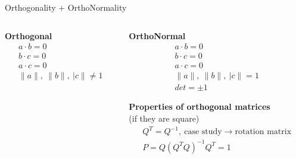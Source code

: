 \documentclass[aspectratio=169]{beamer}
\begin{document}
\begin{frame}[t]{Orthogonality + OrthoNormality}
\begin{columns}[T,onlytextwidth]
\begin{column}{0.49\textwidth}
            \begin{minipage}{0.58\textwidth}
            \end{minipage}\hfill
            \begin{minipage}{0.40\textwidth}
                \centering\textbf{Orthogonal}
                \begin{align*}
                    a \cdot b = 0 \\
                    b \cdot c = 0 \\
                    a \cdot c = 0 \\
                    \|a\|,\ \|b\|,\ |c\| \neq 1
                \end{align*}
            \end{minipage}
        \end{column}
        \begin{column}{0.49\textwidth}
            \begin{minipage}{0.58\textwidth}
            \end{minipage}\hfill
            \begin{minipage}{0.40\textwidth}
                \centering\textbf{OrthoNormal}
                \begin{align*}
                    a \cdot b = 0            \\
                    b \cdot c = 0            \\
                    a \cdot c = 0            \\
                    \|a\|,\ \|b\|,\ |c\| = 1 \\
                    det= \pm 1
                \end{align*}
            \end{minipage}
            \centering \textbf{Properties of orthogonal matrices} \\ {\centering (if they are square)}
            \begin{align*}
                Q^T=Q^{-1},\ \text{case study} \rightarrow \text{rotation matrix} \\
                P = Q(Q^TQ)^{-1}Q^T=1
            \end{align*}
        \end{column}
    \end{columns}
\end{frame}
\end{document}
